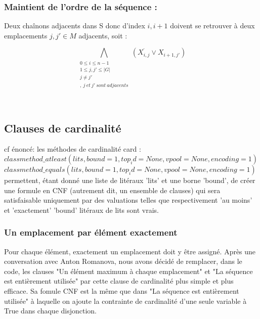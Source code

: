 \documentclass[utf8]{article}
\begin{document}
\subsubsection{Maintient de l'ordre de la séquence :}
Deux chaînons adjacents dans S donc d'index $i,i+1$  doivent se retrouver à deux emplacements $j,j' \in M$ adjacents, soit : \\

\begin{center}
    \[ \bigwedge_{\substack{0\leq i\leq n-1
    \\1\leq j,j'\leq |G|
    \\ j\neq j'
    \\,\> j \>et\> j' \>sont \> adjacents}}(\overline{X_{i,j}} \vee X_{i+1,j'}) \]
\end{center} \\

\subsection{Clauses de cardinalité}

cf énoncé: les méthodes de cardinalité card : \\
$classmethod\_atleast(lits, bound=1, top_id=None, vpool=None, encoding=1) $\\
$classmethod\_equals(lits, bound=1, top_id=None, vpool=None, encoding=1) $\\

permettent, étant donné une liste de litéraux 'lits' et une borne 'bound', de créer une formule en CNF (autrement dit, un ensemble de clauses) qui sera satisfaisable uniquement par des valuations telles que respectivement 'au moins' et 'exactement' 'bound' litéraux de lits sont vrais.

\subsubsection{Un emplacement par élément exactement}
Pour chaque élément, exactement un emplacement doit y être assigné.
Après une conversation avec Anton Romanova, nous avons décidé de remplacer, dans le code, les clauses "Un élément maximum à chaque emplacement" et "La séquence est entièrement utilisée" par cette clause de cardinalité plus simple et plus efficace. Sa fomule CNF est la même que dans "La séquence est entièrement utilisée" à laquelle on ajoute la contrainte de cardinalité d'une seule variable à True dans chaque disjonction.
\end{document}
